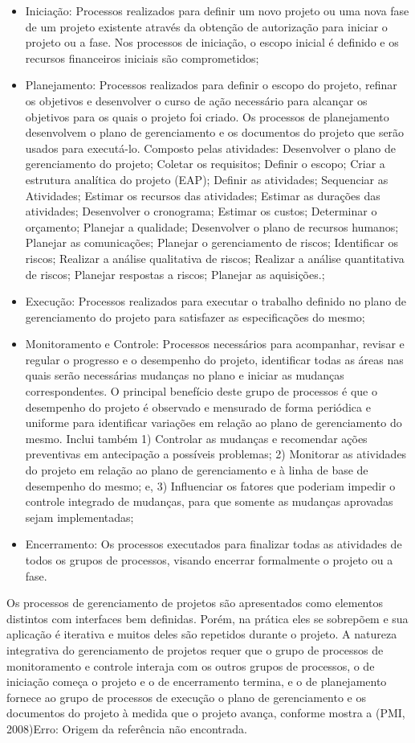 \begin{itemize}
	\item Iniciação: Processos realizados para definir um novo projeto ou uma nova fase de um projeto existente através da obtenção de autorização para iniciar o projeto ou a fase. Nos processos de iniciação, o escopo inicial é definido e os recursos financeiros iniciais são comprometidos;
	\item Planejamento: Processos realizados para definir o escopo do projeto, refinar os objetivos e desenvolver o curso de ação necessário para alcançar os objetivos para os quais o projeto foi criado. Os processos de planejamento desenvolvem o plano de gerenciamento e os documentos do projeto que serão usados para executá-lo. Composto pelas atividades: Desenvolver o plano de gerenciamento do projeto; Coletar os requisitos; Definir o escopo; Criar a estrutura analítica do projeto (EAP); Definir as atividades; Sequenciar as Atividades; Estimar os recursos das atividades; Estimar as durações das atividades; Desenvolver o cronograma; Estimar os custos; Determinar o orçamento; Planejar a qualidade; Desenvolver o plano de recursos humanos; Planejar as comunicações; Planejar o gerenciamento de riscos;  Identificar os riscos; Realizar a análise qualitativa de riscos; Realizar a análise quantitativa de riscos; Planejar respostas a riscos; Planejar as aquisições.;
	\item Execução: Processos realizados para executar o trabalho definido no plano de gerenciamento do projeto para satisfazer as especificações do mesmo;
	\item Monitoramento e Controle: Processos necessários para acompanhar, revisar e regular o progresso e o desempenho do projeto, identificar todas as áreas nas quais serão necessárias mudanças no plano e iniciar as mudanças correspondentes. O principal benefício deste grupo de processos é que o desempenho do projeto é observado e mensurado de forma periódica e uniforme para identificar variações em relação ao plano de gerenciamento do mesmo. Inclui também 1) Controlar as mudanças e recomendar ações preventivas em antecipação a possíveis problemas; 2) Monitorar as atividades do projeto em relação ao plano de gerenciamento e à linha de base de desempenho do mesmo; e, 3) Influenciar os fatores que poderiam impedir o controle integrado de mudanças, para que somente as mudanças aprovadas sejam implementadas;
	\item Encerramento: Os processos executados para finalizar todas as atividades de todos os grupos de processos, visando encerrar formalmente o projeto ou a fase.
\end{itemize}
Os processos de gerenciamento de projetos são apresentados como elementos distintos com interfaces bem definidas. Porém, na prática eles se sobrepõem e sua aplicação é iterativa e muitos deles são repetidos durante o projeto. A natureza integrativa do gerenciamento de projetos requer que o grupo de processos de monitoramento e controle interaja com os outros grupos de processos, o de iniciação começa o projeto e o de encerramento termina, e o de planejamento fornece ao grupo de processos de execução o plano de gerenciamento e os documentos do projeto à medida que o projeto avança, conforme mostra a (PMI, 2008)Erro: Origem da referência não encontrada.

